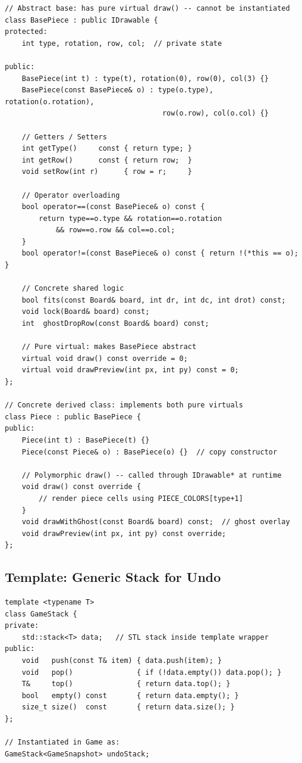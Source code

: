\documentclass[11pt]{article}
\begin{document}
\begin{lstlisting}[caption={BasePiece (abstract) and Piece (concrete) with polymorphic draw()}]
// Abstract base: has pure virtual draw() -- cannot be instantiated
class BasePiece : public IDrawable {
protected:
    int type, rotation, row, col;  // private state

public:
    BasePiece(int t) : type(t), rotation(0), row(0), col(3) {}
    BasePiece(const BasePiece& o) : type(o.type), rotation(o.rotation),
                                     row(o.row), col(o.col) {}

    // Getters / Setters
    int getType()     const { return type; }
    int getRow()      const { return row;  }
    void setRow(int r)      { row = r;     }

    // Operator overloading
    bool operator==(const BasePiece& o) const {
        return type==o.type && rotation==o.rotation
            && row==o.row && col==o.col;
    }
    bool operator!=(const BasePiece& o) const { return !(*this == o); }

    // Concrete shared logic
    bool fits(const Board& board, int dr, int dc, int drot) const;
    void lock(Board& board) const;
    int  ghostDropRow(const Board& board) const;

    // Pure virtual: makes BasePiece abstract
    virtual void draw() const override = 0;
    virtual void drawPreview(int px, int py) const = 0;
};

// Concrete derived class: implements both pure virtuals
class Piece : public BasePiece {
public:
    Piece(int t) : BasePiece(t) {}
    Piece(const Piece& o) : BasePiece(o) {}  // copy constructor

    // Polymorphic draw() -- called through IDrawable* at runtime
    void draw() const override {
        // render piece cells using PIECE_COLORS[type+1]
    }
    void drawWithGhost(const Board& board) const;  // ghost overlay
    void drawPreview(int px, int py) const override;
};
\end{lstlisting}

\subsection{Template: Generic Stack for Undo}

\begin{lstlisting}[caption={GameStack<T> --- template class used for undo history}]
template <typename T>
class GameStack {
private:
    std::stack<T> data;   // STL stack inside template wrapper
public:
    void   push(const T& item) { data.push(item); }
    void   pop()               { if (!data.empty()) data.pop(); }
    T&     top()               { return data.top(); }
    bool   empty() const       { return data.empty(); }
    size_t size()  const       { return data.size(); }
};

// Instantiated in Game as:
GameStack<GameSnapshot> undoStack;
\end{lstlisting}
\end{document}
